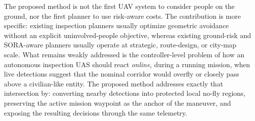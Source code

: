 \documentclass[drones,article,submit,moreauthors]{Definitions/mdpi}
\begin{document}




The proposed method is not the first UAV system to consider people on the ground, nor the first planner to use risk-aware costs. The contribution is more specific: existing inspection planners usually optimize geometric avoidance without an explicit uninvolved-people objective, whereas existing ground-risk and SORA-aware planners usually operate at strategic, route-design, or city-map scale. What remains weakly addressed is the controller-level problem of how an autonomous inspection UAS should react \emph{online}, during a running mission, when live detections suggest that the nominal corridor would overfly or closely pass above a civilian-like entity. The proposed method addresses exactly that intersection by: converting nearby detections into protected local no-fly regions, preserving the active mission waypoint as the anchor of the maneuver, and exposing the resulting decisions through the same telemetry. 
\end{document}
